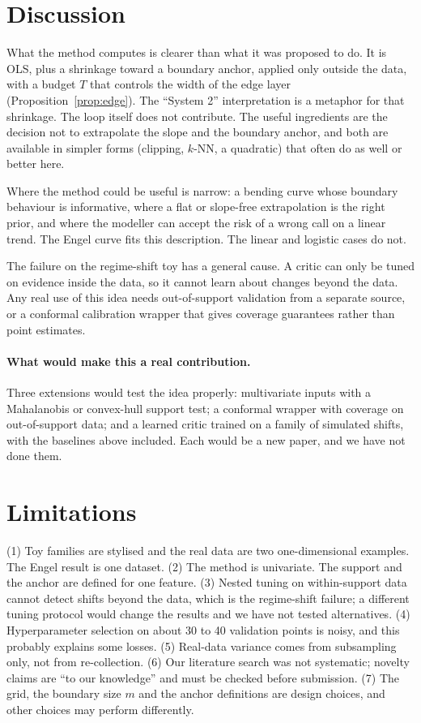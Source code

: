 \documentclass[10pt]{article}
\begin{document}
\section{Discussion}
What the method computes is clearer than what it was proposed to do. It is OLS, plus a shrinkage toward a boundary anchor, applied only outside the data, with a budget $T$ that controls the width of the edge layer (Proposition~\ref{prop:edge}). The ``System 2'' interpretation is a metaphor for that shrinkage. The loop itself does not contribute. The useful ingredients are the decision not to extrapolate the slope and the boundary anchor, and both are available in simpler forms (clipping, $k$-NN, a quadratic) that often do as well or better here.

Where the method could be useful is narrow: a bending curve whose boundary behaviour is informative, where a flat or slope-free extrapolation is the right prior, and where the modeller can accept the risk of a wrong call on a linear trend. The Engel curve fits this description. The linear and logistic cases do not.

The failure on the regime-shift toy has a general cause. A critic can only be tuned on evidence inside the data, so it cannot learn about changes beyond the data. Any real use of this idea needs out-of-support validation from a separate source, or a conformal calibration wrapper \cite{vovk2005,angelopoulos2021} that gives coverage guarantees rather than point estimates.

\paragraph{What would make this a real contribution.} Three extensions would test the idea properly: multivariate inputs with a Mahalanobis or convex-hull support test; a conformal wrapper with coverage on out-of-support data; and a learned critic trained on a family of simulated shifts, with the baselines above included. Each would be a new paper, and we have not done them.

\section{Limitations}
(1) Toy families are stylised and the real data are two one-dimensional examples. The Engel result is one dataset. (2) The method is univariate. The support and the anchor are defined for one feature. (3) Nested tuning on within-support data cannot detect shifts beyond the data, which is the regime-shift failure; a different tuning protocol would change the results and we have not tested alternatives. (4) Hyperparameter selection on about 30 to 40 validation points is noisy, and this probably explains some losses. (5) Real-data variance comes from subsampling only, not from re-collection. (6) Our literature search was not systematic; novelty claims are ``to our knowledge'' and must be checked before submission. (7) The grid, the boundary size $m$ and the anchor definitions are design choices, and other choices may perform differently.
\end{document}
